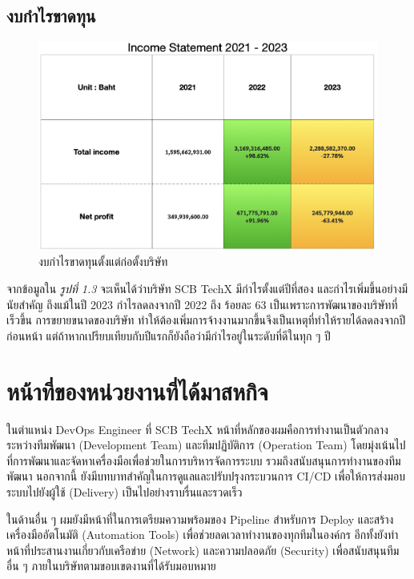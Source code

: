 \subsection{งบกำไรขาดทุน}
\begin{figure}[ht]
    \begin{center}
        \includegraphics[scale=0.4]{images/profit.png}
    \end{center}
    \caption[งบกำไรขาดทุนย้อนหลังตั้งแต่ก่อตั้งบริษัท]{งบกำไรขาดทุนตั้งแต่ก่อตั้งบริษัท}
\end{figure}
จากข้อมูลใน \textit{รูปที่ 1.3} จะเห็นได้ว่าบริษัท SCB TechX มีกำไรตั้งแต่ปีที่สอง และกำไรเพิ่มขึ้นอย่างมีนัยสำคัญ ถึงแม้ในปี 2023 กำไรลดลงจากปี 2022 ถึง ร้อยละ 63 เป็นเพราะการพัฒนาของบริษัทที่เร็วขึ้น การขยายขนาดของบริษัท ทำให้ต้องเพิ่มการจ้างงานมากขึ้นจึงเป็นเหตุที่ทำให้รายได้ลดลงจากปีก่อนหน้า แต่ถ้าหากเปรียบเทียบกับปีแรกก็ยังถือว่ามีกำไรอยู่ในระดับที่ดีในทุก ๆ ปี


\section{หน้าที่ของหน่วยงานที่ได้มาสหกิจ}
ในตำแหน่ง DevOps Engineer ที่ SCB TechX หน้าที่หลักของผมคือการทำงานเป็นตัวกลางระหว่างทีมพัฒนา (Development Team) และทีมปฏิบัติการ (Operation Team) โดยมุ่งเน้นไปที่การพัฒนาและจัดหาเครื่องมือเพื่อช่วยในการบริหารจัดการระบบ รวมถึงสนับสนุนการทำงานของทีมพัฒนา นอกจากนี้ ยังมีบทบาทสำคัญในการดูแลและปรับปรุงกระบวนการ CI/CD เพื่อให้การส่งมอบระบบไปยังผู้ใช้ (Delivery) เป็นไปอย่างราบรื่นและรวดเร็ว

ในด้านอื่น ๆ ผมยังมีหน้าที่ในการเตรียมความพร้อมของ Pipeline สำหรับการ Deploy และสร้างเครื่องมืออัตโนมัติ (Automation Tools) เพื่อช่วยลดเวลาทำงานของทุกทีมในองค์กร อีกทั้งยังทำหน้าที่ประสานงานเกี่ยวกับเครือข่าย (Network) และความปลอดภัย (Security) เพื่อสนับสนุนทีมอื่น ๆ ภายในบริษัทตามขอบเขตงานที่ได้รับมอบหมาย